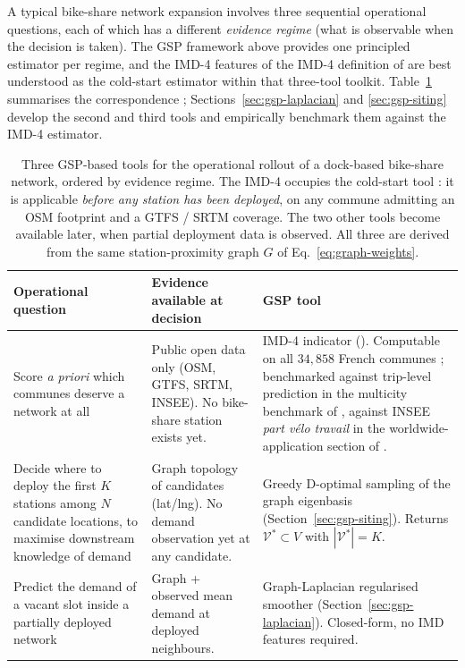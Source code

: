 A typical bike-share network expansion involves three sequential
operational questions, each of which has a different
\emph{evidence regime} (what is observable when the decision is
taken).  The GSP framework above provides one principled
estimator per regime, and the IMD-4 features of
the IMD-4 definition of \citet{Fosse2026imd_national} are best understood as the cold-start
estimator within that three-tool toolkit.  Table~\ref{tab:toolkit}
summarises the correspondence ; Sections~\ref{sec:gsp-laplacian}
and \ref{sec:gsp-siting} develop the second and third tools and
empirically benchmark them against the IMD-4 estimator.

\begin{table}[H]
\centering
\caption{Three GSP-based tools for the operational rollout of a
dock-based bike-share network, ordered by evidence regime.  The
IMD-4 occupies the cold-start tool : it is applicable
\emph{before any station has been deployed}, on any commune
admitting an OSM footprint and a GTFS / SRTM coverage.  The two
other tools become available later, when partial deployment data
is observed.  All three are derived from the same
station-proximity graph $G$ of Eq.~\eqref{eq:graph-weights}.}
\label{tab:toolkit}
\small
\begin{tabular}{@{}p{}p{}p{}@{}}
\toprule
Operational question & Evidence available at decision & GSP tool \\
\midrule
Score \emph{a priori} which communes deserve a network at all
  & Public open data only (OSM, GTFS, SRTM, INSEE).
    No bike-share station exists yet.
  & IMD-4 indicator (\citet{Fosse2026imd_national}).
    Computable on all $34{,}858$ French communes ; benchmarked
    against trip-level prediction in
    the multicity benchmark of \citet{Fosse2026imd_national}, against
    INSEE \emph{part v\'elo travail} in the worldwide-application section of \citet{Fosse2026imd_national}.
    \\[0.7em]
Decide where to deploy the first $K$ stations among $N$ candidate
  locations, to maximise downstream knowledge of demand
  & Graph topology of candidates (lat/lng).  No demand
    observation yet at any candidate.
  & Greedy D-optimal sampling of the graph eigenbasis
    (Section~\ref{sec:gsp-siting}). Returns
    $\mathcal{V}^* \subset V$ with $|\mathcal{V}^*| = K$. \\[0.7em]
Predict the demand of a vacant slot inside a partially deployed
  network
  & Graph + observed mean demand at deployed neighbours.
  & Graph-Laplacian regularised smoother
    (Section~\ref{sec:gsp-laplacian}).
    Closed-form, no IMD features required.
    \\
\bottomrule
\end{tabular}
\end{table}

